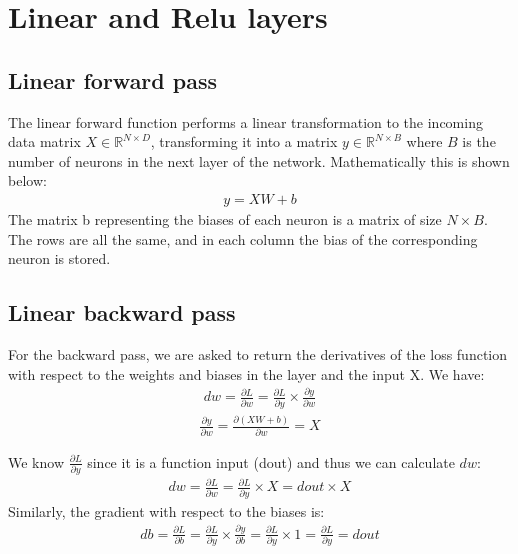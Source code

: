 \documentclass[12pt,twoside]{article}
\begin{document}




\section{Linear and Relu layers}
\subsection{Linear forward pass}

The linear forward function performs a linear transformation to the incoming data matrix $X \in \mathbb{R}^{N \times D}$, transforming it into a matrix $y \in \mathbb{R}^{N \times B}$ where $B$ is the number of neurons in the next layer of the network. Mathematically this is shown below:
\begin{align}
y = XW + b
\end{align}
The matrix b representing the biases of each neuron is a matrix of size $N \times B$. The rows are all the same, and in each column the bias of the corresponding neuron is stored.


\subsection{Linear backward pass}

For the backward pass, we are asked to return the derivatives of the loss function with respect to the weights and biases in the layer and the input X.
We have:
\begin{align}
dw = \frac{\partial L}{\partial w} = \frac{\partial L}{\partial y} \times \frac{\partial y}{\partial w}
\end{align}
\begin{align*}
\frac{\partial y}{\partial w} = \frac{\partial (XW + b)}{\partial w} = X
\end{align*}

We know $\frac{\partial L}{\partial y}$ since it is a function input (dout) and thus we can calculate $dw$:
\begin{align}
dw = \frac{\partial L}{\partial w} = \frac{\partial L}{\partial y} \times X = dout \times X
\end{align}
Similarly, the gradient with respect to the biases is:
\begin{align*}
db = \frac{\partial L}{\partial b} = \frac{\partial L}{\partial y} \times \frac{\partial y}{\partial b} = \frac{\partial L}{\partial y} \times 1 = \frac{\partial L}{\partial y} = dout
\end{align*}
\end{document}
